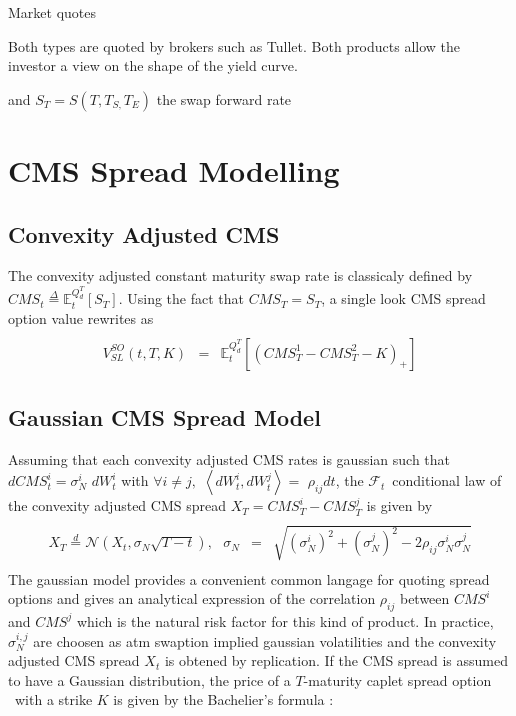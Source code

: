 \documentclass[3pt]{article}
\begin{document}
\bigskip

\bigskip

\bigskip 

\bigskip \bigskip Market quotes

Both types are quoted by brokers such as Tullet. Both products allow the
investor a view on the shape of the yield curve.\bigskip \bigskip 

and $S_{T}=S(T,T_{S,}T_{E})$ the swap forward rate

\section{CMS Spread Modelling}

\bigskip

\subsection{Convexity Adjusted CMS}

The convexity adjusted constant maturity swap rate is classicaly defined by $%
CMS_{t}\overset{\Delta }{=}\mathbb{E}_{t}^{Q_{d}^{T}}\left[ S_{T}\right] .$
Using the fact that $CMS_{T}=S_{T}$, a single look CMS spread option value
rewrites as 
\begin{eqnarray*}
&& \\
V_{SL}^{SO}(t,T,K) &=&\mathbb{E}_{t}^{Q_{d}^{T}}\left[ \left(
CMS_{T}^{1}-CMS_{T}^{2}-K\right) _{+}\right] 
\end{eqnarray*}

\subsection{Gaussian CMS Spread Model}

Assuming that each convexity adjusted CMS rates is gaussian such that $%
dCMS_{t}^{i}=\sigma _{N}^{i}$ $dW_{t}^{i}$ with $\forall i\neq j,$ $%
\left\langle dW_{t}^{i},dW_{t}^{j}\right\rangle =$ $\rho _{ij}dt$, the $%
\mathcal{F}_{t}$\ conditional law of the convexity adjusted CMS spread $%
X_{T}=CMS_{T}^{i}-CMS_{T}^{j}$ is given by 
\begin{eqnarray*}
&& \\
X_{T}\overset{d}{=}\mathcal{N}\left( X_{t},\sigma _{N}\sqrt{T-t}\right) ,%
\text{ \ \ }\sigma _{N} &=&\sqrt{\left( \sigma _{N}^{i}\right) ^{2}+(\sigma
_{N}^{j})^{2}-2\rho _{ij}\sigma _{N}^{i}\sigma _{N}^{j}} \\
&&
\end{eqnarray*}%
The gaussian model provides a convenient common langage for quoting spread
options and gives an analytical expression of the correlation $\rho _{ij}$
between $CMS^{i}$ and $CMS^{j}$ which is the natural risk factor for this
kind of product. In practice, $\sigma _{N}^{i,j}$ are choosen as atm
swaption implied gaussian volatilities and the convexity adjusted CMS spread 
$X_{t}$ is  obtened by replication. If the CMS spread is assumed to have a
Gaussian distribution, the price of a $T$-maturity caplet spread option \
with a strike $K$ is given by the Bachelier's formula : 
\end{document}

